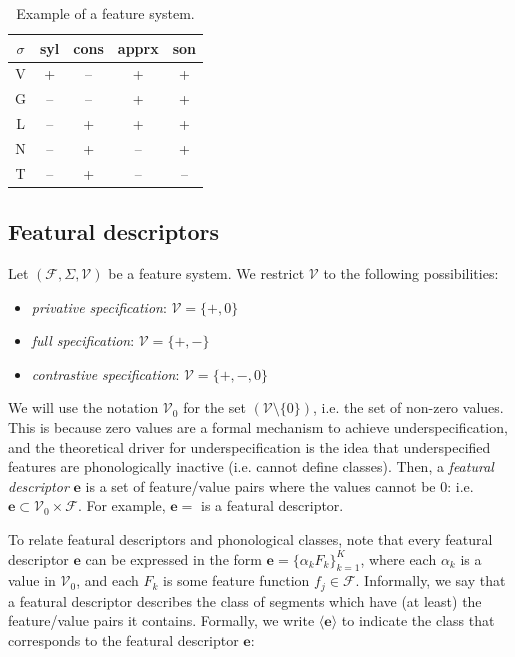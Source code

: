 \documentclass[11pt, oneside]{article}   	%
\begin{document}
\begin{table}[h]
    \centering
    \begin{tabular} {|c||c|c|c|c|}
    \hline
        $\sigma$ & syl & cons & apprx & son \\ \hline
        V & + & -- & + & + \\
        G & -- & -- & + & + \\
        L & -- & + & + & + \\
        N & -- & + & -- & + \\
        T & -- & + & -- & -- \\
        \hline
    \end{tabular}
    \caption{Example of a feature system.}
    \label{table:featurization}
\end{table}

\subsection{Featural descriptors}

Let $(\mathcal F, \Sigma, \mathcal V)$ be a feature system. We restrict $\mathcal V$ to the following possibilities: \begin{itemize}
    \item \textit{privative specification}: $\mathcal V = \{ +, 0 \}$
    \item \textit{full specification}: $\mathcal V = \{ +, - \}$
    \item \textit{contrastive specification}: $\mathcal V = \{ +, -, 0 \}$
    \end{itemize}

We will use the notation $\mathcal V_0$ for the set $(\mathcal V \setminus \{0\})$, i.e. the set of non-zero values. This is because zero values are a formal mechanism to achieve underspecification, and the theoretical driver for underspecification is the idea that underspecified features are phonologically inactive (i.e. cannot define classes). Then, a \textit{featural descriptor} $\mathbf{e}$ is a set of feature/value pairs where the values cannot be $0$: i.e. $\mathbf{e} \subset \mathcal V_0 \times \mathcal F$. For example, $\mathbf{e} =$   is a featural descriptor.

To relate featural descriptors and phonological classes, note that every featural descriptor $\mathbf{e}$ can be expressed in the form $\mathbf{e} = \{\alpha_k F_k\}_{k=1}^K$, where each $\alpha_k$ is a value in $\mathcal V_0$, and each $F_k$ is some feature function $f_j \in \mathcal F$. Informally, we say that a featural descriptor describes the class of segments which have (at least) the feature/value pairs it contains. Formally, we write $\langle \mathbf{e} \rangle$ to indicate the class that corresponds to the featural descriptor $\mathbf{e}$:
\end{document}
